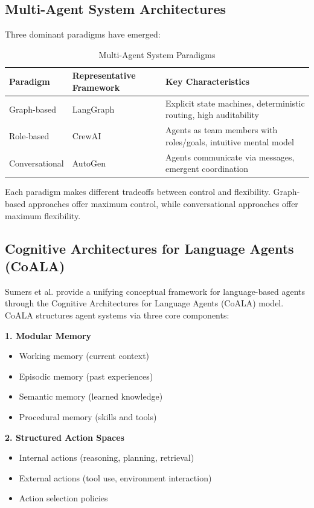 \subsection{Multi-Agent System Architectures}
\label{subsec:mas-architectures}

Three dominant paradigms have emerged:

\begin{table}[htbp]
\centering
\caption{Multi-Agent System Paradigms}
\label{tab:mas-paradigms}
\begin{tabular}{lll}
\toprule
\textbf{Paradigm} & \textbf{Representative Framework} & \textbf{Key Characteristics} \\
\midrule
Graph-based & LangGraph & Explicit state machines, deterministic routing, high auditability \\
Role-based & CrewAI & Agents as team members with roles/goals, intuitive mental model \\
Conversational & AutoGen & Agents communicate via messages, emergent coordination \\
\bottomrule
\end{tabular}
\end{table}

Each paradigm makes different tradeoffs between control and flexibility. Graph-based approaches offer maximum control, while conversational approaches offer maximum flexibility.

\subsection{Cognitive Architectures for Language Agents (CoALA)}
\label{subsec:coala}

Sumers et al. \citep{sumers2024} provide a unifying conceptual framework for language-based agents through the Cognitive Architectures for Language Agents (CoALA) model. CoALA structures agent systems via three core components:

\textbf{1. Modular Memory}
\begin{itemize}
    \item Working memory (current context)
    \item Episodic memory (past experiences)
    \item Semantic memory (learned knowledge)
    \item Procedural memory (skills and tools)
\end{itemize}

\textbf{2. Structured Action Spaces}
\begin{itemize}
    \item Internal actions (reasoning, planning, retrieval)
    \item External actions (tool use, environment interaction)
    \item Action selection policies
\end{itemize}

